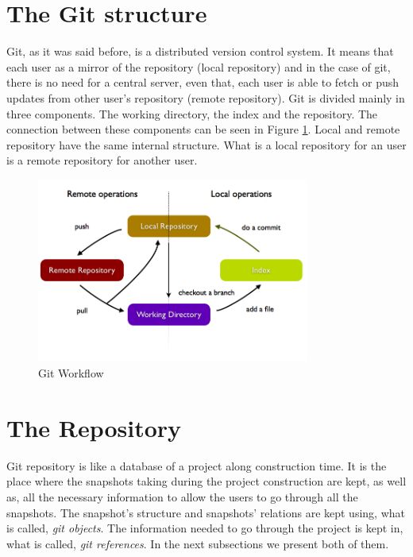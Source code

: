 \section{The Git structure}
Git, as it was said before, is a distributed version control system.
It means that each user as a mirror of the repository (local
repository) and in the case of
git, there is no need for a central server, even that, each user is able to
fetch or push updates from other user's repository (remote repository).
Git is divided mainly in three components. The working directory,
the index and the repository. The connection between these components
can be seen in Figure \ref{fig:git_structure}. Local and remote
repository have the same internal structure. What is a local
repository for an user is a remote repository for another user.

\begin{figure}[!t]
   \centering
   \includegraphics[width=0.8\textwidth]{images/data_flow_simplified.png}
   \caption{Git Workflow}\label{fig:git_structure}
\end{figure}

\section{The Repository}
Git repository is like a database of a project along construction time. It is
the place where the snapshots taking during the project construction
are kept, as well as, all the necessary information to
allow the users to go through all the snapshots. The snapshot's
structure and snapshots' relations are kept using, what is called, \emph{git
objects}. The information needed to go through the project is kept in,
what is called, \emph{git references}. In the next subsections we
present both of them.


